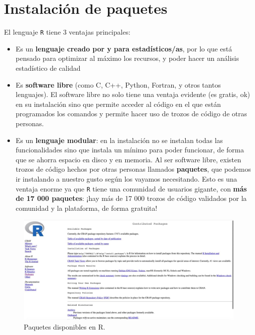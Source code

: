 \documentclass[11pt,]{book}
\begin{document}
\hypertarget{instalacionpaquetes}{%
\section{Instalación de paquetes}\label{instalacionpaquetes}}

El lenguaje \texttt{R} tiene 3 ventajas principales:

\begin{itemize}
\item
  Es un \textbf{lenguaje creado por y para estadísticos/as}, por lo que está pensado para optimizar al máximo los recursos, y poder hacer un análisis estadístico de calidad
\item
  Es \textbf{software libre} (como C, C++, Python, Fortran, y otros tantos lenguajes). El software libre no solo tiene una ventaja evidente (es gratis, ok) en su instalación sino que permite acceder al código en el que están programados los comandos y permite hacer uso de trozos de código de otras personas.
\item
  Es un \textbf{lenguaje modular}: en la instalación no se instalan todas las funcionalidades sino que instala un mínimo para poder funcionar, de forma que se ahorra espacio en disco y en memoria. Al ser software libre, existen trozos de código hechos por otras personas llamados \textbf{paquetes}, que podemos ir instalando a nuestro gusto según los vayamos necesitando. Esto es una ventaja enorme ya que \texttt{R} tiene una comunidad de usuarios gigante, con \textbf{más de 17 000 paquetes}: ¡hay más de 17 000 trozos de código validados por la comunidad y la plataforma, de forma gratuita!
\end{itemize}

\begin{figure}

{\centering \includegraphics[width=0.75\linewidth]{./img/paquetes_R} 

}

\caption{Paquetes disponibles en R.}\label{fig:paquetes-R}
\end{figure}
\end{document}
